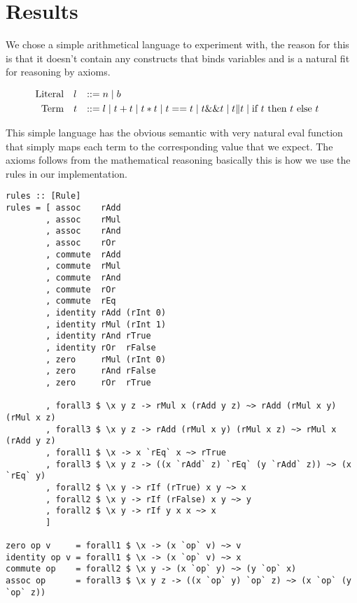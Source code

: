 
\section{Results}

We chose a simple arithmetical language to experiment with, the reason for this
is that it doesn't contain any constructs that binds variables and is a natural
fit for reasoning by axioms.


\begin{equation*}
\begin{aligned}
\text{Literal}\quad&l&::=&\;n \;|\; b&\text{} \\
\text{Term}\quad&t&::=&\;l \;|\; t + t \;|\; t * t \;|\; t == t \;|\; t \&\& t
                 \;|\; t \| t \;|\; \text{if } t \text{ then } t \text{ else } t
                 &\text{} 
\end{aligned}
\end{equation*}

This simple language has the obvious semantic with very natural eval function
that simply maps each term to the corresponding value that we expect. The axioms
follows from the mathematical reasoning basically this is how we use the rules
in our implementation.

\begin{verbatim}
rules :: [Rule]
rules = [ assoc    rAdd
        , assoc    rMul
        , assoc    rAnd
        , assoc    rOr
        , commute  rAdd
        , commute  rMul
        , commute  rAnd
        , commute  rOr
        , commute  rEq
        , identity rAdd (rInt 0)
        , identity rMul (rInt 1)
        , identity rAnd rTrue
        , identity rOr  rFalse
        , zero     rMul (rInt 0)
        , zero     rAnd rFalse
        , zero     rOr  rTrue

        , forall3 $ \x y z -> rMul x (rAdd y z) ~> rAdd (rMul x y) (rMul x z)
        , forall3 $ \x y z -> rAdd (rMul x y) (rMul x z) ~> rMul x (rAdd y z)
        , forall1 $ \x -> x `rEq` x ~> rTrue
        , forall3 $ \x y z -> ((x `rAdd` z) `rEq` (y `rAdd` z)) ~> (x `rEq` y)
        , forall2 $ \x y -> rIf (rTrue) x y ~> x
        , forall2 $ \x y -> rIf (rFalse) x y ~> y
        , forall2 $ \x y -> rIf y x x ~> x
        ]

zero op v     = forall1 $ \x -> (x `op` v) ~> v
identity op v = forall1 $ \x -> (x `op` v) ~> x
commute op    = forall2 $ \x y -> (x `op` y) ~> (y `op` x)
assoc op      = forall3 $ \x y z -> ((x `op` y) `op` z) ~> (x `op` (y `op` z))
\end{verbatim}

